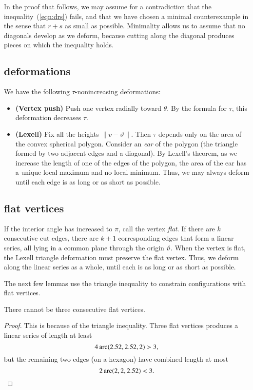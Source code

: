 In the proof that follows, we may assume for a contradiction that the
inequality~(\ref{eqn:drs}) fails, and that we have chosen a minimal counterexample in the sense that $r+s$ as small as possible.   Minimality allows us to assume that no diagonals develop as we deform, because cutting along the diagonal produces pieces on which the inequality holds.

\subsection{deformations}

We have the following $\tau$-nonincreasing deformations:
\begin{itemize}
\item {\bf (Vertex push)} Push one vertex radially toward $\theta$.  By the formula for $\tau$, this deformation decreases $\tau$.
\item {\bf (Lexell)} Fix all the heights $\|v-\vartheta\|$. Then $\tau$ depends only on the area of the convex spherical polygon.  Consider an {\it ear} of the polygon (the triangle formed by two adjacent edges and a diagonal).  By Lexell's theorem, as we increase the length of one of the edges of the polygon, the area of the ear has a unique local maximum and no local minimum.  Thus, we may always deform until each edge is as long or as short as possible.
\end{itemize}

\subsection{flat vertices}

If the interior angle has increased to $\pi$, call the vertex {\it flat}. 
If there are $k$ consecutive cut edges, there are  $k+1$ corresponding edges that form a linear series, all lying in a common plane through the origin $\vartheta$.  When the vertex is flat, the Lexell triangle deformation must preserve the flat vertex.  Thus, we deform along the linear series as a whole, until each is as long or as short as possible.  

The next few lemmas use the triangle inequality to constrain configurations with flat vertices.

\begin{lemma}
There cannot be three consecutive flat vertices.
\end{lemma}

\begin{proof} This is because of the triangle inequality.  Three flat vertices produces a linear series of length at least
$$
4\operatorname{arc}(2.52,2.52,2) > 3,
$$
but the remaining two edges (on a hexagon) have combined length at most
$$
2\operatorname{arc}(2,2,2.52) < 3.
$$
\end{proof}


